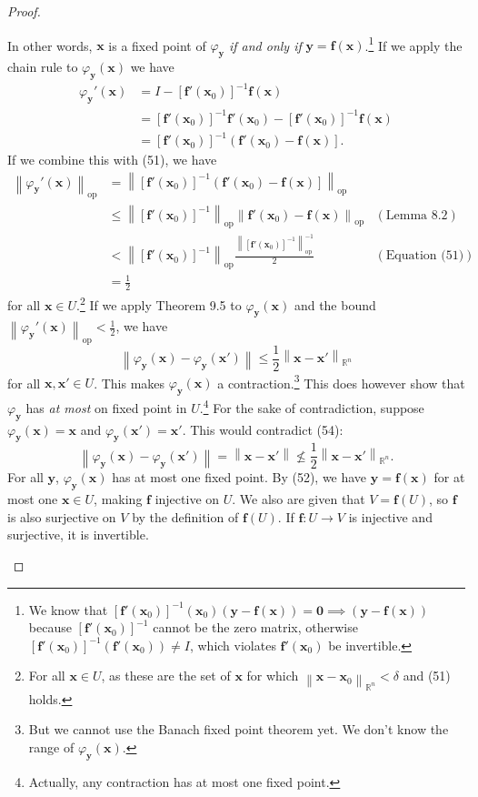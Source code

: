 \documentclass{article}
\newcommand{\R}{\mathbb{R}}
\newcommand{\x}{\mathbf{x}}
\newcommand{\f}{\mathbf{f}}
\newcommand{\y}{\mathbf{y}}
\newcommand{\ze}{\mathbf{0}}
\newcommand{\norm}[1]{\left\lVert#1\right\rVert}
\newcommand{\normop}[1]{\left\lVert#1\right\rVert_\text{op}}
\theoremstyle{definition}
\begin{document}
\begin{proof}
\begin{enumerate}
\begin{equation}
			\end{equation}In other words, $ \x $ is a fixed point of $ \varphi_\y $ \textit{if and only if} $ \y = \f(\x) $.\footnote{We know that $[\f'(\x_0)]^{-1}(\x_0)(\y - \f(\x)) = \ze \implies (\y - \f(\x))$ because $ [\f'(\x_0)]^{-1} $ cannot be the zero matrix, otherwise $ [\f'(\x_0)]^{-1}(\f'(\x_0))\neq I $, which violates $ \f'(\x_0) $ be invertible.} If we apply the chain rule to $ \varphi_\y(\x) $ we have
			\begin{align}
				\varphi_\y'(\x) &= I -  [\f'(\x_0)]^{-1} \f(\x)\nonumber\\ 
				& =  [\f'(\x_0)]^{-1}\f'(\x_0) -  [\f'(\x_0)]^{-1} \f(\x)\nonumber\\ 
				& = [\f'(\x_0)]^{-1}\left(\f'(\x_0) - \f(\x)\right].
			\end{align}
			If we combine this with (51), we have 
			\begin{align*}
				\normop{\varphi_\y'(\x)} & = \normop{[\f'(\x_0)]^{-1}\left(\f'(\x_0) - \f(\x)\right]} \\
				& \le \normop{[\f'(\x_0)]^{-1}}\normop{\f'(\x_0) - \f(\x)}& (\text{Lemma 8.2})\\ & 
				< \normop{[\f'(\x_0)]^{-1}}\frac{\normop{[\f'(\x_0)]^{-1}}^{-1}}{2} & (\text{Equation (51)})\\
				& = \frac{1}{2}
			\end{align*}
			for all $ \x \in U $.\footnote{For all $ \x\in U $, as these are the set of $ \x $ for which $ \norm{\x-\x_0}_{\R^n} < \delta $ and (51) holds.} If we apply Theorem 9.5 to $ \varphi_\y(\x) $ and the bound $ 	\normop{\varphi_\y'(\x)} < \frac{1}{2} $, we have 
			\begin{equation}\label{key}
				\norm{\varphi_\y(\x) - \varphi_\y(\x')} \le \frac{1}{2}\norm{\x-\x'}_{\R^n} 
			\end{equation}
			for all $ \x,\x'\in U $. This makes $ \varphi_\y(\x) $ a contraction.\footnote{But we cannot use the Banach fixed point theorem yet. We don't know the range of $ \varphi_\y(\x) $.} This does however show that $ \varphi_\y $ has \textit{at most} on fixed point in $ U $.\footnote{Actually, any contraction has at most one fixed point.} For the sake of contradiction, suppose $ \varphi_\y(\x)=\x $ and $ \varphi_\y(\x')=\x'  $. This would contradict (54): 
			$$ \norm{\varphi_\y(\x) - \varphi_\y(\x')} = \norm{\x - \x'} \not\le  \frac{1}{2}\norm{\x-\x'}_{\R^n} .$$
			For all $ \y $, $ \varphi_\y(\x) $ has at most one fixed point. By (52), we have $ \y = \f(\x) $ for at most one $ \x\in U $, making $ \f $ injective on $ U $. We also are given that $ V = \f(U) $, so $ \f $ is also surjective on $ V $ by the definition of $ \f(U) $. If $ \f:U\to V $ is injective and surjective, it is invertible. 

\end{enumerate}
\end{proof}
\end{document}

